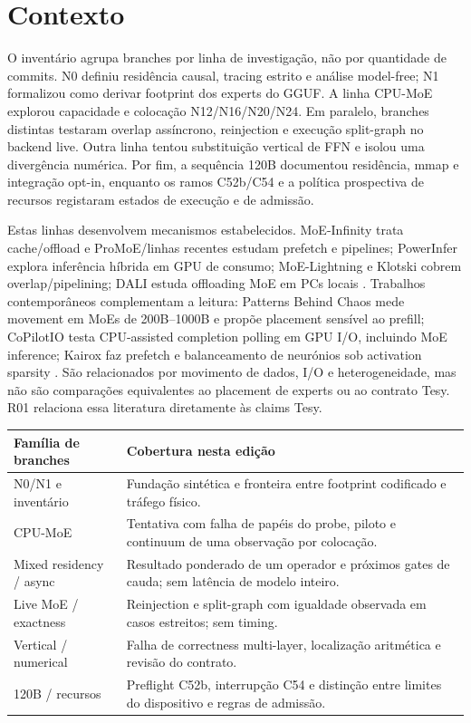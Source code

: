 \section{Contexto}
O inventário agrupa branches por linha de investigação, não por quantidade de commits. N0 definiu residência causal, tracing estrito e análise model-free; N1 formalizou como derivar footprint dos experts do GGUF. A linha CPU-MoE explorou capacidade e colocação N12/N16/N20/N24. Em paralelo, branches distintas testaram overlap assíncrono, reinjection e execução split-graph no backend live. Outra linha tentou substituição vertical de FFN e isolou uma divergência numérica. Por fim, a sequência 120B documentou residência, mmap e integração opt-in, enquanto os ramos C52b/C54 e a política prospectiva de recursos registaram estados de execução e de admissão.

Estas linhas desenvolvem mecanismos estabelecidos. MoE-Infinity trata cache/offload e ProMoE/linhas recentes estudam prefetch e pipelines; PowerInfer explora inferência híbrida em GPU de consumo; MoE-Lightning e Klotski cobrem overlap/pipelining; DALI estuda offloading MoE em PCs locais \cite{xue2024moeinfinity,song2024powerinfer,cao2025moelightning,fang2025klotski,zhu2026dali}. Trabalhos contemporâneos complementam a leitura: Patterns Behind Chaos mede movement em MoEs de 200B--1000B e propõe placement sensível ao prefill; CoPilotIO testa CPU-assisted completion polling em GPU I/O, incluindo MoE inference; Kairox faz prefetch e balanceamento de neurónios sob activation sparsity \cite{yu2026patterns,chen2026copilotio,jiang2026kairox}. São relacionados por movimento de dados, I/O e heterogeneidade, mas não são comparações equivalentes ao placement de experts ou ao contrato Tesy. R01 relaciona essa literatura diretamente às claims Tesy.

\begin{tabularx}{\linewidth}{@{}p{38mm}Y@{}}
\toprule
\textbf{Família de branches} & \textbf{Cobertura nesta edição}\\\midrule
N0/N1 e inventário & Fundação sintética e fronteira entre footprint codificado e tráfego físico.\\
CPU-MoE & Tentativa com falha de papéis do probe, piloto e continuum de uma observação por colocação.\\
Mixed residency / async & Resultado ponderado de um operador e próximos gates de cauda; sem latência de modelo inteiro.\\
Live MoE / exactness & Reinjection e split-graph com igualdade observada em casos estreitos; sem timing.\\
Vertical / numerical & Falha de correctness multi-layer, localização aritmética e revisão do contrato.\\
120B / recursos & Preflight C52b, interrupção C54 e distinção entre limites do dispositivo e regras de admissão.\\
\bottomrule
\end{tabularx}
